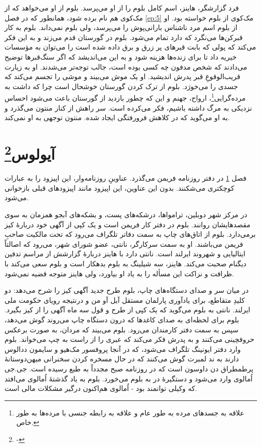 \documentclass[12pt]{book}
\begin{document}
    فرد گزارشگر، هاینز، اسم کامل بلوم را از او می‌پرسد. بلوم از او می‌خواهد که از مک‌کوی هم نام برده شود، همانطور که در فصل \ref{ep:5} مک‌کوی از بلوم خواسته بود. او از بلوم اسم مرد ناشناس بارانی‌پوش را می‌پرسد، ولی بلوم نمی‌داند. بلوم به کار قبرکن‌ها می‌نگرد که دارد تمام می‌شود. بلوم در گورستان قدم می‌زند و به این فکر می‌کند که پولی که بابت قبرهای پر زرق و برق داده شده است را می‌توان به مؤسسات خیریه داد تا برای زنده‌ها هزینه شود و به این می‌اندیشد که اگر سنگ‌قبرها توضیح می‌دادند که شخص مدفون چه کسی بوده است، جالب توجه‌تر می‌شدند. او به زیارت قریب‌الوقوعِ قبر پدرش اندیشید. او یک موش می‌بیند و موشی را تجسم می‌کند که جسدی را می‌خورَد. بلوم از ترک کردن گورستان خوشحال است چرا که داشت به مرده‌گرایی\footnote{علاقه به جسدهای مرده به طور عام و علاقه به رابطه جنسی با مرده‌ها به طور خاص.}، ارواح، جهنم و این که چطور بازدید از گورستان باعث می‌شود احساس نزدیکی به مرگ داشته باشیم، فکر می‌کرده است. سر راهش از کنار منتون می‌گذرد و به او می‌گوید که در کلاهش فرورفتگی ایجاد شده. منتون توجهی به او نمی‌کند.

    \chapter[آیولوس]{آیولوس\protect\footnote{-}}\label{ep:7}
    فصل \ref{ep:7} در دفتر روزنامه فریمن می‌گذرد. عناوینِ روزنامه‌وار، این اپیزود را به عبارات کوچکتری می‌شکنند. بدون این عناوین، این اپیزود مانند اپیزودهای قبلی بازخوانی می‌شود.

    در مرکز شهر دوبلین، ترامواها، درشکه‌های پست، و بشکه‌های آبجو همزمان به سوی مقصدهایشان روانند. بلوم در دفتر کار فریمن است و یک کپی از آگهی خود دربارۀ کیز برمی‌دارد. بلوم از اتاق‌های چاپ به سمت دفاتر تلگراف می‌رود که تحت مالکیت صاحبِ فریمن می‌باشند. او به سمت سرکارگر، نانتی، عضو شورای شهر، می‌رود که اصالتاً ایتالیایی و شهروند ایرلند است. نانتی دارد با هاینز دربارۀ گزارشش از مراسم تدفین دیگنام صحبت می‌کند. هاینز، سه شیلینگ به بلوم بدهکار است و بلوم سعی می‌کند با ظرافت و نزاکت این مسأله را به یاد او بیاورد، ولی هاینز متوجه قضیه نمی‌شود.

    در میان سر و صدای دستگاه‌های چاپ، بلوم طرح جدید آگهی کیز را شرح می‌دهد: دو کلیدِ متقاطع، برای یادآوری پارلمان مستقل آیل آو من و درنتیجه رویای حکومت ملی ایرلند. نانتی به بلوم می‌گوید که یک کپی از طرح و قول سه ماه آگهی را از کیز بگیرد. بلوم برای لحظه‌ای به صدای کاغدها که درون دستگاه چاپ می‌روند گوش می‌دهد، سپس به سمت دفتر کارمندان می‌رود. بلوم می‌بیند که مردان، به صورت برعکس حروفچینی می‌کنند و به پدرش فکر می‌کند که عبری را از راست به چپ می‌خواند. بلوم وارد دفتر ایونینگ تلگراف می‌شود، که در آنجا پروفسور مک‌هیو و سایمون ددالوس دارند به ند لمبرت گوش می‌کنند که در حال مسخره کردن سخنرانی میهن‌دوستانۀ پرطمطراق دن داوسون است که در روزنامه صبح مجدداً به طبع رسیده است. جی.جی اُمالوی وارد می‌شود و دستگیرۀ در به بلوم می‌خورد. بلوم به یاد گذشتۀ اُمالوی می‌افتد که وکیلی توانمند بود - اُمالوی هم‌اکنون درگیر مشکلات مالی است.
\end{document}
